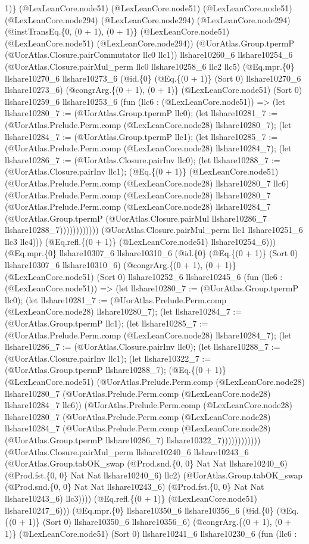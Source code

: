 \documentclass[11pt]{article}
\begin{document}
1)\} (@LexLeanCore.node51) (@LexLeanCore.node51) (@LexLeanCore.node51) (@LexLeanCore.node294) (@LexLeanCore.node294) (@LexLeanCore.node294) (@instTransEq.\{0, (0 + 1), (0 + 1)\} (@LexLeanCore.node51) (@LexLeanCore.node51) (@LexLeanCore.node294)) (@UorAtlas.Group.tpermP (@UorAtlas.Closure.pairCommutator llc0 llc1)) llshare10260\_6 llshare10254\_6 (@UorAtlas.Closure.pairMul\_perm llc0 llshare10258\_6 llc2 llc5) (@Eq.mpr.\{0\} llshare10270\_6 llshare10273\_6 (@id.\{0\} (@Eq.\{(0 + 1)\} (Sort 0) llshare10270\_6 llshare10273\_6) (@congrArg.\{(0 + 1), (0 + 1)\} (@LexLeanCore.node51) (Sort 0) llshare10259\_6 llshare10253\_6 (fun (llc6 : (@LexLeanCore.node51)) => (let llshare10280\_7 := (@UorAtlas.Group.tpermP llc0); (let llshare10281\_7 := (@UorAtlas.Prelude.Perm.comp (@LexLeanCore.node28) llshare10280\_7); (let llshare10284\_7 := (@UorAtlas.Group.tpermP llc1); (let llshare10285\_7 := (@UorAtlas.Prelude.Perm.comp (@LexLeanCore.node28) llshare10284\_7); (let llshare10286\_7 := (@UorAtlas.Closure.pairInv llc0); (let llshare10288\_7 := (@UorAtlas.Closure.pairInv llc1); (@Eq.\{(0 + 1)\} (@LexLeanCore.node51) (@UorAtlas.Prelude.Perm.comp (@LexLeanCore.node28) llshare10280\_7 llc6) (@UorAtlas.Prelude.Perm.comp (@LexLeanCore.node28) llshare10280\_7 (@UorAtlas.Prelude.Perm.comp (@LexLeanCore.node28) llshare10284\_7 (@UorAtlas.Group.tpermP (@UorAtlas.Closure.pairMul llshare10286\_7 llshare10288\_7)))))))))))) (@UorAtlas.Closure.pairMul\_perm llc1 llshare10251\_6 llc3 llc4))) (@Eq.refl.\{(0 + 1)\} (@LexLeanCore.node51) llshare10254\_6))) (@Eq.mpr.\{0\} llshare10307\_6 llshare10310\_6 (@id.\{0\} (@Eq.\{(0 + 1)\} (Sort 0) llshare10307\_6 llshare10310\_6) (@congrArg.\{(0 + 1), (0 + 1)\} (@LexLeanCore.node51) (Sort 0) llshare10252\_6 llshare10245\_6 (fun (llc6 : (@LexLeanCore.node51)) => (let llshare10280\_7 := (@UorAtlas.Group.tpermP llc0); (let llshare10281\_7 := (@UorAtlas.Prelude.Perm.comp (@LexLeanCore.node28) llshare10280\_7); (let llshare10284\_7 := (@UorAtlas.Group.tpermP llc1); (let llshare10285\_7 := (@UorAtlas.Prelude.Perm.comp (@LexLeanCore.node28) llshare10284\_7); (let llshare10286\_7 := (@UorAtlas.Closure.pairInv llc0); (let llshare10288\_7 := (@UorAtlas.Closure.pairInv llc1); (let llshare10322\_7 := (@UorAtlas.Group.tpermP llshare10288\_7); (@Eq.\{(0 + 1)\} (@LexLeanCore.node51) (@UorAtlas.Prelude.Perm.comp (@LexLeanCore.node28) llshare10280\_7 (@UorAtlas.Prelude.Perm.comp (@LexLeanCore.node28) llshare10284\_7 llc6)) (@UorAtlas.Prelude.Perm.comp (@LexLeanCore.node28) llshare10280\_7 (@UorAtlas.Prelude.Perm.comp (@LexLeanCore.node28) llshare10284\_7 (@UorAtlas.Prelude.Perm.comp (@LexLeanCore.node28) (@UorAtlas.Group.tpermP llshare10286\_7) llshare10322\_7)))))))))))) (@UorAtlas.Closure.pairMul\_perm llshare10240\_6 llshare10243\_6 (@UorAtlas.Group.tabOK\_swap (@Prod.snd.\{0, 0\} Nat Nat llshare10240\_6) (@Prod.fst.\{0, 0\} Nat Nat llshare10240\_6) llc2) (@UorAtlas.Group.tabOK\_swap (@Prod.snd.\{0, 0\} Nat Nat llshare10243\_6) (@Prod.fst.\{0, 0\} Nat Nat llshare10243\_6) llc3)))) (@Eq.refl.\{(0 + 1)\} (@LexLeanCore.node51) llshare10247\_6))) (@Eq.mpr.\{0\} llshare10350\_6 llshare10356\_6 (@id.\{0\} (@Eq.\{(0 + 1)\} (Sort 0) llshare10350\_6 llshare10356\_6) (@congrArg.\{(0 + 1), (0 + 1)\} (@LexLeanCore.node51) (Sort 0) llshare10241\_6 llshare10230\_6 (fun (llc6 : 
\end{document}
